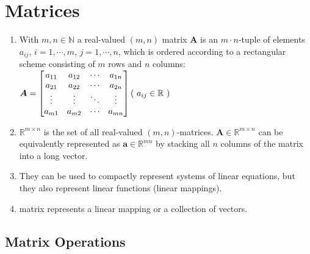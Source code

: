 \chapter{Matrices}

\begin{enumerate}
    \item With $m, n \in \mathbb{N}$ a real-valued $(m, n)$ matrix $\bm{A}$ is an $m\cdot n$-tuple of elements $a_{ij}$, $i = 1, \cdots , m$, $j = 1, \cdots , n$, which is ordered according to a rectangular scheme consisting of $m$ rows and $n$ columns:
    \\[0.2cm]
    $
        \bm{A}
        = 
        \begin{bmatrix}
            a_{11} & a_{12} & \cdots & a_{1n} \\
            a_{21} & a_{22} & \cdots & a_{2n} \\
            \vdots & \vdots & \ddots & \vdots \\
            a_{m1} & a_{m2} & \cdots & a_{mn} \\
        \end{bmatrix}
        \hfill
        (\ a_{ij} \in \mathbb{R} \ )
    $
    \hfill \cite{mfml/book/mml/Deisenroth-Faisal-Ong}

    \item $\mathbb{R}^{m\times n}$ is the set of all real-valued $(m, n)$-matrices. $\bm{A} \in \mathbb{R}^{m\times n}$ can be equivalently represented as $\bm{a} \in \mathbb{R}^{mn}$ by stacking all $n$ columns of the matrix into a long vector.
    \hfill \cite{mfml/book/mml/Deisenroth-Faisal-Ong}

    \vspace{0.5cm}

    \item They can be used to compactly represent systems of linear equations, but they also represent linear functions (linear mappings).
    \hfill \cite{mfml/book/mml/Deisenroth-Faisal-Ong}

    \item matrix represents a linear mapping or a collection of vectors.
    \hfill \cite{mfml/book/mml/Deisenroth-Faisal-Ong}
\end{enumerate}


\section{Matrix Operations}










